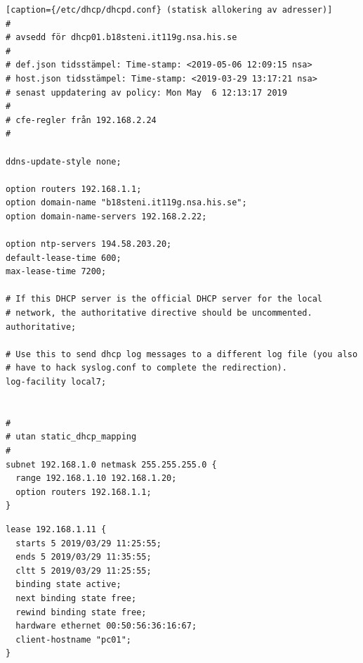 \documentclass[swedish,10pt,a4paper]{article}
\begin{document}
\begin{lstlisting}[caption={/etc/dhcp/dhcpd.conf} (statisk allokering av adresser)]
#
# avsedd för dhcp01.b18steni.it119g.nsa.his.se
#
# def.json tidsstämpel: Time-stamp: <2019-05-06 12:09:15 nsa>
# host.json tidsstämpel: Time-stamp: <2019-03-29 13:17:21 nsa>
# senast uppdatering av policy: Mon May  6 12:13:17 2019
#
# cfe-regler från 192.168.2.24
#

ddns-update-style none;

option routers 192.168.1.1;
option domain-name "b18steni.it119g.nsa.his.se";
option domain-name-servers 192.168.2.22;

option ntp-servers 194.58.203.20;
default-lease-time 600;
max-lease-time 7200;

# If this DHCP server is the official DHCP server for the local
# network, the authoritative directive should be uncommented.
authoritative;

# Use this to send dhcp log messages to a different log file (you also
# have to hack syslog.conf to complete the redirection).
log-facility local7;


#
# utan static_dhcp_mapping
#
subnet 192.168.1.0 netmask 255.255.255.0 {
  range 192.168.1.10 192.168.1.20;
  option routers 192.168.1.1;
}
\end{lstlisting}

\begin{lstlisting}[caption={/var/lib/dhcp/dhcpd.leases}]
lease 192.168.1.11 {
  starts 5 2019/03/29 11:25:55;
  ends 5 2019/03/29 11:35:55;
  cltt 5 2019/03/29 11:25:55;
  binding state active;
  next binding state free;
  rewind binding state free;
  hardware ethernet 00:50:56:36:16:67;
  client-hostname "pc01";
}
\end{lstlisting}

\printbibliography{}
\end{document}
